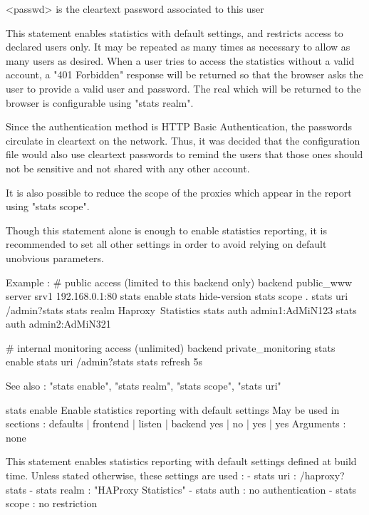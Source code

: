     <passwd>  is the cleartext password associated to this user

  This statement enables statistics with default settings, and restricts access
  to declared users only. It may be repeated as many times as necessary to
  allow as many users as desired. When a user tries to access the statistics
  without a valid account, a "401 Forbidden" response will be returned so that
  the browser asks the user to provide a valid user and password. The real
  which will be returned to the browser is configurable using "stats realm".

  Since the authentication method is HTTP Basic Authentication, the passwords
  circulate in cleartext on the network. Thus, it was decided that the
  configuration file would also use cleartext passwords to remind the users
  that those ones should not be sensitive and not shared with any other account.

  It is also possible to reduce the scope of the proxies which appear in the
  report using "stats scope".

  Though this statement alone is enough to enable statistics reporting, it is
  recommended to set all other settings in order to avoid relying on default
  unobvious parameters.

  Example :
    # public access (limited to this backend only)
    backend public_www
        server srv1 192.168.0.1:80
        stats enable
        stats hide-version
        stats scope   .
        stats uri     /admin?stats
        stats realm   Haproxy\ Statistics
        stats auth    admin1:AdMiN123
        stats auth    admin2:AdMiN321

    # internal monitoring access (unlimited)
    backend private_monitoring
        stats enable
        stats uri     /admin?stats
        stats refresh 5s

  See also : "stats enable", "stats realm", "stats scope", "stats uri"


stats enable
  Enable statistics reporting with default settings
  May be used in sections :   defaults | frontend | listen | backend
                                 yes   |    no    |   yes  |   yes
  Arguments : none

  This statement enables statistics reporting with default settings defined
  at build time. Unless stated otherwise, these settings are used :
    - stats uri   : /haproxy?stats
    - stats realm : "HAProxy Statistics"
    - stats auth  : no authentication
    - stats scope : no restriction

